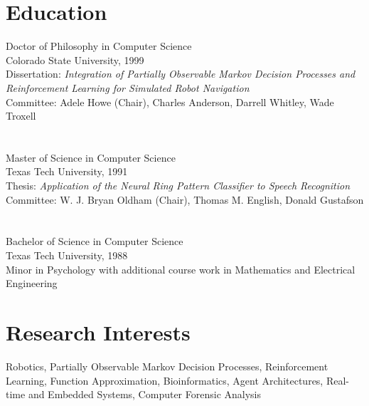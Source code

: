 \documentclass[10pt]{resume}
\makeatletter
\newcommand\myaddress{1029 East Saint Francis St.\\ Rapid City, SD 57701 \\
         ldpyeatt@gmail.com \\ (806)241-6151}
\makeatother
\begin{document}

\pagestyle{fancyplain}
\thispagestyle{empty}

\address{\myaddress}
\line


\section{Education}
  {Doctor of Philosophy in Computer Science}
  {\\Colorado State University, 1999 \\
  Dissertation:  {\it Integration of Partially Observable Markov
Decision Processes and Reinforcement Learning for Simulated Robot 
Navigation}\\ 
  Committee: Adele Howe (Chair), Charles Anderson, 
  Darrell Whitley, Wade Troxell }
   
\section{} 
  {Master of Science in Computer Science}    
  {\\Texas Tech University, 1991 \\
  Thesis:   {\it Application of the Neural Ring Pattern Classifier
  to Speech Recognition}\\
  Committee: W. J. Bryan Oldham (Chair), Thomas M. English, Donald Gustafson}
   
\section{} 
  {Bachelor of Science in Computer Science}    
  {\\Texas Tech University, 1988 \\
  Minor in Psychology with additional course work in Mathematics and 
  Electrical Engineering}

\section{Research Interests}  
  {}
  {Robotics,
   Partially Observable Markov Decision Processes,
   Reinforcement Learning, Function Approximation, Bioinformatics, Agent Architectures, Real-time and Embedded Systems, Computer Forensic Analysis }
\end{document}
